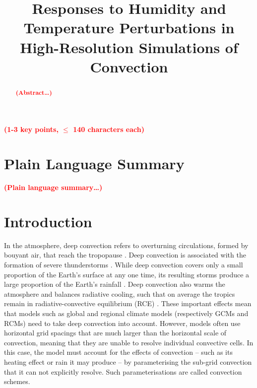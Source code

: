 \documentclass[draft]{agujournal2019}
\newcommand{\todo}[1]{\textcolor{red}{\textbf{(#1)}}}
\begin{document}
\title{Responses to Humidity and Temperature Perturbations in High-Resolution Simulations of Convection}




\begin{keypoints}
\item \todo{1-3 key points, $\leq$ 140 characters each}
\end{keypoints}

\justifying
\begin{abstract}
\todo{Abstract\ldots}
\end{abstract}

\section*{Plain Language Summary}
\todo{Plain language summary\ldots}

\section{Introduction}

In the atmosphere, deep convection refers to overturning circulations, formed by
bouyant air, that reach the tropopause \cite{Wallace_2006}. Deep convection is
associated with the formation of severe thunderstorms \cite{Doswell_2001}. While
deep convection covers only a small proportion of the Earth's surface at any one
time, its resulting storms produce a large proportion of the Earth's rainfall
\cite{Wallace_2006}. Deep convection also warms the atmosphere and balances
radiative cooling, such that on average the tropics remain in
radiative-convective equilibrium (RCE) \cite{Manabe_JAS_1964}. These important
effects mean that models such as global and regional climate models
(respectively GCMs and RCMs) need to take deep convection into account. However,
models often use horizontal grid spacings that are much larger than the
horizontal scale of convection, meaning that they are unable to resolve
individual convective cells. In this case, the model must account for the
effects of convection -- such as its heating effect or rain it may produce -- by
parameterising the sub-grid convection that it can not explicitly resolve. Such
parameterisations are called convection schemes. 
\end{document}
